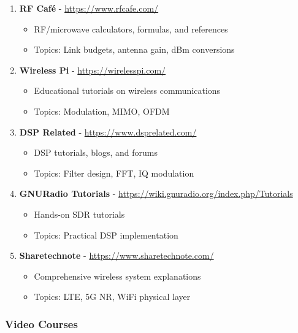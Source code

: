 \begin{enumerate}
\def\labelenumi{\arabic{enumi}.}
\setcounter{enumi}{35}
\tightlist
\item
  \textbf{RF Café} - \url{https://www.rfcafe.com/}

  \begin{itemize}
  \tightlist
  \item
    RF/microwave calculators, formulas, and references
  \item
    Topics: Link budgets, antenna gain, dBm conversions
  \end{itemize}
\item
  \textbf{Wireless Pi} - \url{https://wirelesspi.com/}

  \begin{itemize}
  \tightlist
  \item
    Educational tutorials on wireless communications
  \item
    Topics: Modulation, MIMO, OFDM
  \end{itemize}
\item
  \textbf{DSP Related} - \url{https://www.dsprelated.com/}

  \begin{itemize}
  \tightlist
  \item
    DSP tutorials, blogs, and forums
  \item
    Topics: Filter design, FFT, IQ modulation
  \end{itemize}
\item
  \textbf{GNURadio Tutorials} - \url{https://wiki.gnuradio.org/index.php/Tutorials}

  \begin{itemize}
  \tightlist
  \item
    Hands-on SDR tutorials
  \item
    Topics: Practical DSP implementation
  \end{itemize}
\item
  \textbf{Sharetechnote} - \url{https://www.sharetechnote.com/}

  \begin{itemize}
  \tightlist
  \item
    Comprehensive wireless system explanations
  \item
    Topics: LTE, 5G NR, WiFi physical layer
  \end{itemize}
\end{enumerate}

\subsubsection{Video Courses}\label{video-courses}


